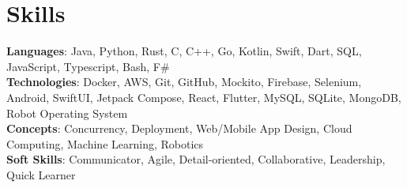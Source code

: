 \documentclass[letterpaper,10pt]{article}
\begin{document}
\section{Skills}
 \begin{itemize}[leftmargin=0.15in, label={}]
    \small{\item{
    	\textbf{Languages}{: Java, Python, Rust, C, C++, Go, Kotlin, Swift, Dart, SQL, JavaScript, Typescript, Bash, F\#} \\
    	\textbf{Technologies}{: Docker, AWS, Git, GitHub, Mockito, Firebase, Selenium, Android, SwiftUI, Jetpack Compose, React, Flutter, MySQL, SQLite, MongoDB, Robot Operating System} \\
		\textbf{Concepts}{: Concurrency, Deployment, Web/Mobile App Design, Cloud Computing, Machine Learning, Robotics}\\
    	\textbf{Soft Skills}{: Communicator, Agile, Detail-oriented, Collaborative, Leadership, Quick Learner} \\
    }}
 \end{itemize}


\end{document}

